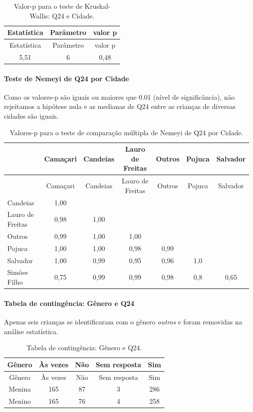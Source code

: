 \documentclass[]{article}
\let\oldparagraph\paragraph
\renewcommand{\paragraph}[1]{\oldparagraph{#1}\mbox{}}
\begin{document}
\begin{longtable}[]{@{}ccc@{}}
\caption{\label{tab:unnamed-chunk-610}Valor-p para o teste de Kruskal-Wallis: Q24 e Cidade.}\tabularnewline
\toprule
Estatística & Parâmetro & valor p\tabularnewline
\midrule
\endfirsthead
\toprule
Estatística & Parâmetro & valor p\tabularnewline
\midrule
\endhead
5,51 & 6 & 0,48\tabularnewline
\bottomrule
\end{longtable}

\hypertarget{teste-de-nemeyi-de-q24-por-cidade}{%
\paragraph{Teste de Nemeyi de Q24 por Cidade}\label{teste-de-nemeyi-de-q24-por-cidade}}

Como os valores-p são iguais ou maiores que 0.01 (nível de significância), não rejeitamos a hipótese nula e as medianas de Q24 entre as crianças de diversas cidades são iguais.

\begin{longtable}[]{@{}lcccccc@{}}
\caption{\label{tab:unnamed-chunk-612}Valores-p para o teste de comparação múltipla de Nemeyi de Q24 por Cidade.}\tabularnewline
\toprule
& Camaçari & Candeias & Lauro de Freitas & Outros & Pojuca & Salvador\tabularnewline
\midrule
\endfirsthead
\toprule
& Camaçari & Candeias & Lauro de Freitas & Outros & Pojuca & Salvador\tabularnewline
\midrule
\endhead
Candeias & 1,00 & & & & &\tabularnewline
Lauro de Freitas & 0,98 & 1,00 & & & &\tabularnewline
Outros & 0,99 & 1,00 & 1,00 & & &\tabularnewline
Pojuca & 1,00 & 1,00 & 0,98 & 0,99 & &\tabularnewline
Salvador & 1,00 & 0,99 & 0,95 & 0,96 & 1,0 &\tabularnewline
Simões Filho & 0,75 & 0,99 & 0,99 & 0,98 & 0,8 & 0,65\tabularnewline
\bottomrule
\end{longtable}

\cleardoublepage

\hypertarget{tabela-de-continguxeancia-guxeanero-e-q24}{%
\paragraph{Tabela de contingência: Gênero e Q24}\label{tabela-de-continguxeancia-guxeanero-e-q24}}

Apenas seis crianças se identificaram com o gênero \emph{outros} e foram removidas na análise estatística.

\begin{longtable}[]{@{}ccccc@{}}
\caption{\label{tab:unnamed-chunk-613}Tabela de contingência: Gênero e Q24.}\tabularnewline
\toprule
Gênero & Às vezes & Não & Sem resposta & Sim\tabularnewline
\midrule
\endfirsthead
\toprule
Gênero & Às vezes & Não & Sem resposta & Sim\tabularnewline
\midrule
\endhead
Menina & 165 & 87 & 3 & 286\tabularnewline
Menino & 165 & 76 & 4 & 258\tabularnewline
\bottomrule
\end{longtable}
\end{document}
